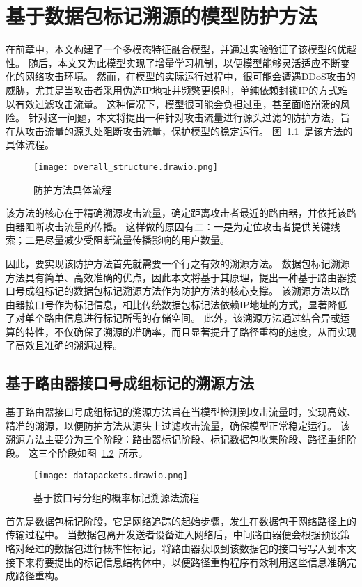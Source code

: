\chapter{基于数据包标记溯源的模型防护方法}
\label{cha:IGPPM}

在前章中，本文构建了一个多模态特征融合模型，并通过实验验证了该模型的优越性。
随后，本文又为此模型实现了增量学习机制，以便模型能够灵活适应不断变化的网络攻击环境。
然而，在模型的实际运行过程中，很可能会遭遇DDoS攻击的威胁，尤其是当攻击者采用伪造IP地址并频繁更换时，单纯依赖封锁IP的方式难以有效过滤攻击流量。
这种情况下，模型很可能会负担过重，甚至面临崩溃的风险。
针对这一问题，本文将提出一种针对攻击流量进行源头过滤的防护方法，旨在从攻击流量的源头处阻断攻击流量，保护模型的稳定运行。
图~\ref{fig:overall_structure}~是该方法的具体流程。
\begin{figure}[h]
	\centering
	\texttt{[image: overall\_structure.drawio.png]}
	\caption{防护方法具体流程}
	\label{fig:overall_structure}
\end{figure}
该方法的核心在于精确溯源攻击流量，确定距离攻击者最近的路由器，并依托该路由器阻断攻击流量的传播。
这样做的原因有二：一是为定位攻击者提供关键线索；二是尽量减少受阻断流量传播影响的用户数量。\par

因此，要实现该防护方法首先就需要一个行之有效的溯源方法。
数据包标记溯源方法具有简单、高效准确的优点，因此本文将基于其原理，提出一种基于路由器接口号成组标记的数据包标记溯源方法作为防护方法的核心支撑。
该溯源方法以路由器接口号作为标记信息，相比传统数据包标记法依赖IP地址的方式，显著降低了对单个路由信息进行标记所需的存储空间。
此外，该溯源方法通过结合异或运算的特性，不仅确保了溯源的准确率，而且显著提升了路径重构的速度，从而实现了高效且准确的溯源过程。

\section{基于路由器接口号成组标记的溯源方法}

基于路由器接口号成组标记的溯源方法旨在当模型检测到攻击流量时，实现高效、精准的溯源，以便防护方法从源头上过滤攻击流量，确保模型正常稳定运行。
该溯源方法主要分为三个阶段：路由器标记阶段、标记数据包收集阶段、路径重组阶段。
这三个阶段如图~\ref{fig:our_datapackets_design}~所示。
\begin{figure}[h]
	\centering
	\texttt{[image: datapackets.drawio.png]}
	\caption{基于接口号分组的概率标记溯源法流程}
	\label{fig:our_datapackets_design}
\end{figure}
首先是数据包标记阶段，它是网络追踪的起始步骤，发生在数据包于网络路径上的传输过程中。
当数据包离开发送者设备进入网络后，中间路由器便会根据预设策略对经过的数据包进行概率性标记，将路由器获取到该数据包的接口号写入到本文接下来将要提出的标记信息结构体中，以便路径重构程序有效利用这些信息准确完成路径重构。

